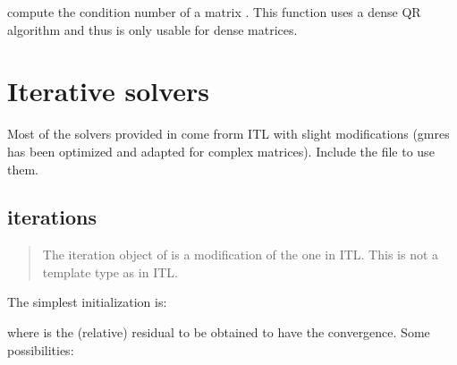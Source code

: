\documentclass[a4paper,11pt,english]{sphinxmanual}
\begin{document}
\begin{sphinxVerbatim}[commandchars=\\\{\}]
\end{sphinxVerbatim}

\sphinxAtStartPar
compute the condition number of a matrix . This function uses a dense QR algorithm and thus is only usable for dense matrices.


\chapter{Iterative solvers}
\label{\detokenize{gmm/iter:iterative-solvers}}\label{\detokenize{gmm/iter:gmm-iter}}\label{\detokenize{gmm/iter::doc}}
\sphinxAtStartPar
Most of the solvers provided in  come frorm ITL with slight modifications (gmres has been optimized and adapted for complex matrices). Include the file  to use them.


\section{iterations}
\label{\detokenize{gmm/iter:iterations}}\begin{quote}

\sphinxAtStartPar
The iteration object of  is a modification of the one in ITL. This is not a template type as in ITL.
\end{quote}

\sphinxAtStartPar
The simplest initialization is:

\begin{sphinxVerbatim}[commandchars=\\\{\}]
 
\end{sphinxVerbatim}

\sphinxAtStartPar
where  is the (relative) residual to be obtained to have the convergence.
Some possibilities:
\end{document}
